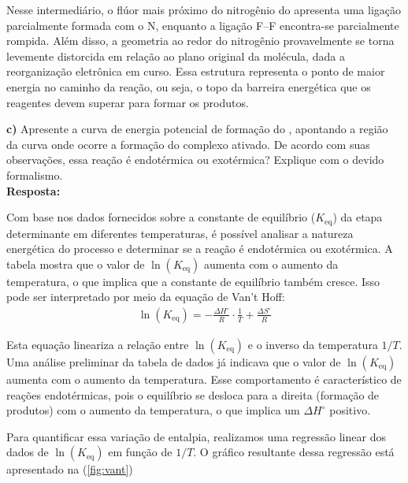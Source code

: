 Nesse intermediário, o flúor mais próximo do nitrogênio do  apresenta uma ligação parcialmente formada com o N, enquanto a ligação F–F encontra-se parcialmente rompida. Além disso, a geometria ao redor do nitrogênio provavelmente se torna levemente distorcida em relação ao plano original da molécula, dada a reorganização eletrônica em curso. Essa estrutura representa o ponto de maior energia no caminho da reação, ou seja, o topo da barreira energética que os reagentes devem superar para formar os produtos.

\commentspace

\textbf{c)} Apresente a curva de energia potencial de formação do , apontando a região da curva onde ocorre a formação do complexo ativado. De acordo com suas observações, essa reação é endotérmica ou exotérmica? Explique com o devido formalismo.\\

\textbf{Resposta:} 

Com base nos dados fornecidos sobre a constante de equilíbrio (\(K_\text{eq}\)) da etapa determinante em diferentes temperaturas, é possível analisar a natureza energética do processo e determinar se a reação é endotérmica ou exotérmica. A tabela mostra que o valor de \(\ln(K_\text{eq})\) aumenta com o aumento da temperatura, o que implica que a constante de equilíbrio também cresce. Isso pode ser interpretado por meio da equação de Van’t Hoff:
\begin{align*}
\ln(K_\text{eq}) = -\frac{\Delta H^\circ}{R} \cdot \frac{1}{T} + \frac{\Delta S^\circ}{R}
\end{align*}

Esta equação lineariza a relação entre \(\ln(K_\text{eq})\) e o inverso da temperatura \(1/T\). Uma análise preliminar da tabela de dados já indicava que o valor de \(\ln(K_\text{eq})\) aumenta com o aumento da temperatura. Esse comportamento é característico de reações endotérmicas, pois o equilíbrio se desloca para a direita (formação de produtos) com o aumento da temperatura, o que implica um \(\Delta H^\circ\) positivo.

Para quantificar essa variação de entalpia, realizamos uma regressão linear dos dados de \(\ln(K_\text{eq})\) em função de \(1/T\). O gráfico resultante dessa regressão está apresentado na (\cref{fig:vant})

